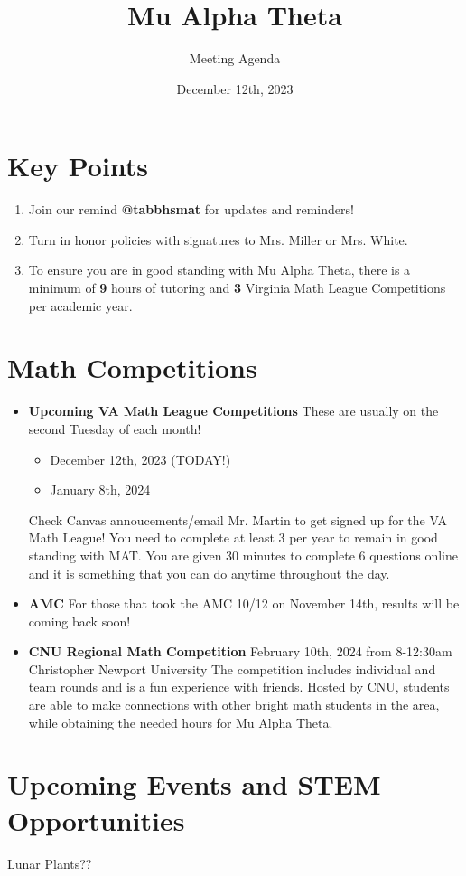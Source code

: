 \documentclass[11pt]{article}
\author{Meeting Agenda}
\title{Mu Alpha Theta}
\date{December 12th, 2023}
\begin{document}
  \maketitle

  \section{Key Points}
    \begin{enumerate}
        \item Join our remind \textbf{@tabbhsmat} for updates and reminders!
        \item Turn in honor policies with signatures to Mrs. Miller or Mrs. White.
        \item To ensure you are in good standing with Mu Alpha Theta, there is a minimum of \textbf{9} hours of tutoring and \textbf{3} Virginia Math League Competitions per academic year.
    \end{enumerate}
  \section{Math Competitions} 
    \begin{itemize}
        \item \textbf{Upcoming VA Math League Competitions} \newline
        These are usually on the second Tuesday of each month!
            \begin{itemize}
                \item December 12th, 2023 (TODAY!)
                \item January 8th, 2024
            \end{itemize}
            Check Canvas annoucements/email Mr. Martin to get signed up for the VA Math League! You need to complete at least 3 per year to remain in good standing with MAT. You are given 30 minutes to complete 6 questions online and it is something that you can do anytime throughout the day. 
        \item \textbf{AMC} \newline
        For those that took the AMC 10/12 on November 14th, results will be coming back soon! 
        \item \textbf{CNU Regional Math Competition} \newline
        February 10th, 2024 from 8-12:30am \newline
        Christopher Newport University \newline
        The competition includes individual and team rounds and is a fun experience with friends. Hosted by CNU, students are able to make connections with other bright math students in the area, while obtaining the needed hours for Mu Alpha Theta. 
    \end{itemize}
    
    \section{Upcoming Events and STEM Opportunities}
    
    \begin{description}
        Lunar Plants??
    \end{description}
      
\end{document}
